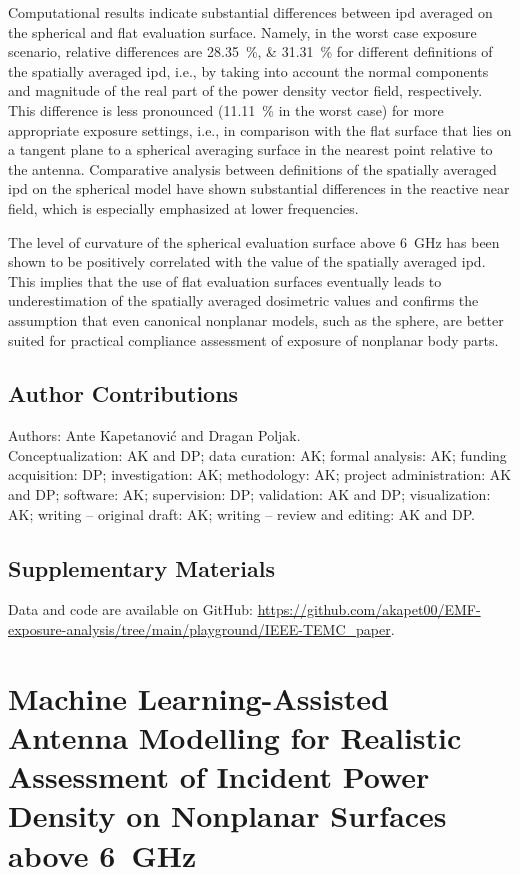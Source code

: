 Computational results indicate substantial differences between \gls{ipd} averaged on the spherical and flat evaluation surface.
Namely, in the worst case exposure scenario, relative differences are \SIlist{28.35;31.31}{\percent} for different definitions of the spatially averaged \gls{ipd}, i.e., by taking into account the normal components and  magnitude of the real part of the power density vector field, respectively.
This difference is less pronounced (\SI{11.11}{\percent} in the worst case) for more appropriate exposure settings, i.e., in comparison with the flat surface that lies on a tangent plane to a spherical averaging surface in the nearest point relative to the antenna.
Comparative analysis between definitions of the spatially averaged \gls{ipd} on the spherical model have shown substantial differences in the reactive near field, which is especially emphasized at lower frequencies.

The level of curvature of the spherical evaluation surface above \SI{6}{\GHz} has been shown to be positively correlated with the value of the spatially averaged \gls{ipd}.
This implies that the use of flat evaluation surfaces eventually leads to underestimation of the spatially averaged dosimetric values and confirms the assumption that even canonical nonplanar models, such as the sphere, are better suited for practical compliance assessment of exposure of nonplanar body parts.

\subsection{Author Contributions}
Authors: Ante Kapetanović and Dragan Poljak.\\
Conceptualization: AK and DP; data curation: AK; formal analysis: AK; funding acquisition: DP; investigation: AK; methodology: AK; project administration: AK and DP; software: AK; supervision: DP; validation: AK and DP; visualization: AK; writing -- original draft: AK; writing -- review and editing: AK and DP.

\subsection{Supplementary Materials}
Data and code are available on GitHub: \url{https://github.com/akapet00/EMF-exposure-analysis/tree/main/playground/IEEE-TEMC_paper}.

\section{Machine Learning-Assisted Antenna Modelling for Realistic Assessment of Incident Power Density on Nonplanar Surfaces above \SI{6}{\GHz}}
\label{sec:publication_2}
